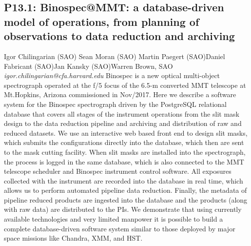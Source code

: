 \documentclass{report}
\begin{document}
\subsection*{P13.1: Binospec@MMT: a database-driven model of operations, from planning of observations to data reduction and archiving}
\bigskip
Igor Chilingarian (SAO) \newline Sean Moran (SAO) \newline  Martin Paegert (SAO)\newline  Daniel Fabricant (SAO)\newline Jan Kansky (SAO)\newline  Warren Brown, SAO\newline\newline
{\it igor.chilingarian@cfa.harvard.edu}\newline
\newline\newline
Binospec is a new optical multi-object spectrograph operated at the f/5 focus of the 6.5-m converted MMT telescope at Mt.Hopkins, Arizona commissioned in Nov/2017.  Here we describe a software system for the Binospec spectrograph driven by the PostgreSQL relational database that covers all stages of the instrument operations from the slit mask design to the data reduction pipeline and archiving and distribution of raw and reduced datasets.  We use an interactive web based front end to design slit masks, which submits the configurations directly into the database, which then are sent to the mask cutting facility.  When slit masks are installed into the spectrograph, the process is logged in the same database, which is also connected to the MMT telescope scheduler and Binospec instrument control software.  All exposures collected with the instrument are recorded into the database in real time, which allows us to perform automated pipeline data reduction.  Finally, the metadata of pipeline reduced products are ingested into the database and the products (along with raw data) are distributed to the PIs.  We demonstrate that using currently available technologies and very limited manpower it is possible to build a complete database-driven software system similar to those deployed by major space missions like Chandra, XMM, and HST.\newline
\newpage
\end{document}
